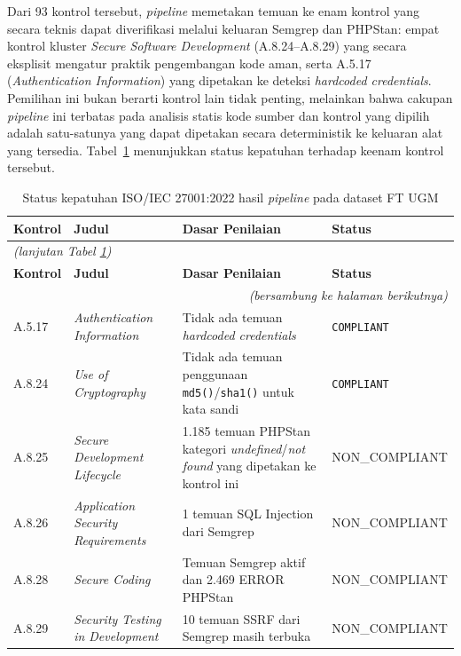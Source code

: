 Dari 93 kontrol tersebut, \textit{pipeline} memetakan temuan
ke enam kontrol yang secara teknis dapat diverifikasi melalui
keluaran Semgrep dan PHPStan: empat kontrol kluster
\textit{Secure Software Development} (A.8.24--A.8.29) yang
secara eksplisit mengatur praktik pengembangan kode aman,
serta A.5.17 (\textit{Authentication Information}) yang
dipetakan ke deteksi \textit{hardcoded credentials}. Pemilihan
ini bukan berarti kontrol lain tidak penting, melainkan bahwa
cakupan \textit{pipeline} ini terbatas pada analisis statis
kode sumber dan kontrol yang dipilih adalah satu-satunya yang
dapat dipetakan secara deterministik ke keluaran alat yang
tersedia. Tabel~\ref{tab:iso-status} menunjukkan status
kepatuhan terhadap keenam kontrol tersebut.

\begin{longtable}{|l|>{\raggedright\arraybackslash}p{2.5cm}|p{6cm}|p{3cm}|}
\caption{Status kepatuhan ISO/IEC 27001:2022 hasil \textit{pipeline} pada dataset FT UGM}
\label{tab:iso-status} \\
\hline
\textbf{Kontrol} & \textbf{Judul} & \textbf{Dasar Penilaian} & \textbf{Status} \\
\hline \hline
\endfirsthead

\multicolumn{4}{l}{\textit{(lanjutan Tabel \ref{tab:iso-status})}} \\
\hline
\textbf{Kontrol} & \textbf{Judul} & \textbf{Dasar Penilaian} & \textbf{Status} \\
\hline \hline
\endhead

\hline
\multicolumn{4}{r}{\textit{(bersambung ke halaman berikutnya)}} \\
\endfoot

\hline
\endlastfoot

A.5.17 & \textit{Authentication Information} &
Tidak ada temuan \textit{hardcoded credentials} &
\texttt{COMPLIANT} \\
\hline

A.8.24 & \textit{Use of Cryptography} &
Tidak ada temuan penggunaan \texttt{md5()}/\texttt{sha1()} untuk kata sandi &
\texttt{COMPLIANT} \\
\hline

A.8.25 & \textit{Secure Development Lifecycle} &
1.185 temuan PHPStan kategori \textit{undefined}/\textit{not found}
yang dipetakan ke kontrol ini &
{\footnotesize\ttfamily NON\_COMPLIANT} \\
\hline

A.8.26 & \textit{Application Security Requirements} &
1 temuan SQL Injection dari Semgrep &
{\footnotesize\ttfamily NON\_COMPLIANT} \\
\hline

A.8.28 & \textit{Secure Coding} &
Temuan Semgrep aktif dan 2.469 ERROR PHPStan &
{\footnotesize\ttfamily NON\_COMPLIANT} \\
\hline

A.8.29 & \textit{Security Testing in Development} &
\begin{minipage}[t]{6cm}10 temuan SSRF dari Semgrep masih terbuka\end{minipage} &
{\footnotesize\ttfamily NON\_COMPLIANT} \\
\end{longtable}
